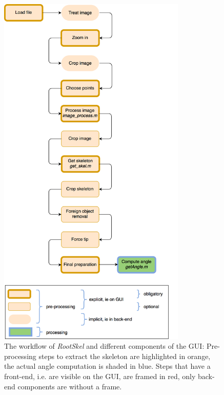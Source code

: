 
\begin{figure}[H]
	\centering
	\includegraphics[width=0.8\textwidth]{../Figures/workflow_big.png}
	\caption{The workflow of \textit{RootSkel} and different components of the GUI: Pre-processing steps to extract the skeleton are highlighted in orange, the actual angle computation is shaded in blue. Steps that have a front-end, i.e. are visible on the GUI, are framed in red, only back-end components are without a frame. }
	\label{fig:workflow}
\end{figure}


